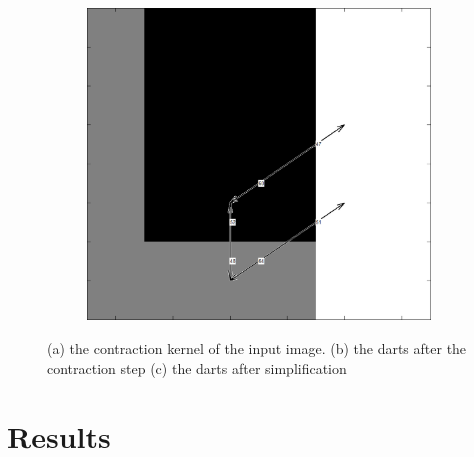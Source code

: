 \documentclass[12pt]{article}
\begin{document}
\begin{figure}[tb]
\begin{subfigure}[b]{0.3\textwidth}
      \caption{}\label{fig:dart_simply3}
    \end{subfigure}
    ~
    \begin{subfigure}[b]{0.3\textwidth}
      \includegraphics[width=\textwidth]{img/simply1.jpg}
      \caption{}\label{fig:dart_simply1}
    \end{subfigure}
  \caption{(a) the contraction kernel of the input image. (b) the darts after the contraction step (c) the darts after simplification}\label{fig:dart_simply}
\end{figure}



\section{Results} %
\label{sec:results}
\end{document}
